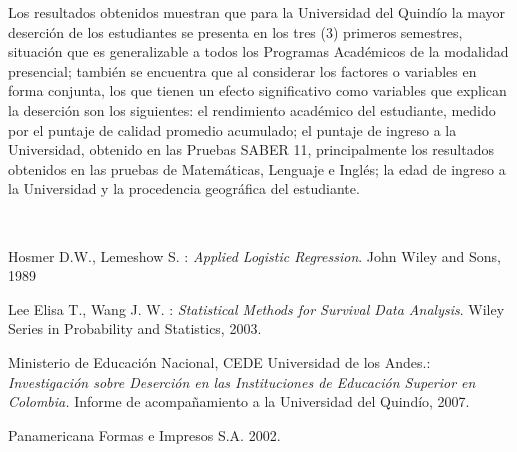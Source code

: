\begin{titlepage}
\begin{minipage}{0.85\linewidth}
\begin{minipage}{0.85\linewidth}
\begin{resumen}
Los resultados obtenidos muestran que para la Universidad del Quind\'io la
mayor deserci\'on de los estudiantes se presenta en los tres (3) primeros
semestres, situaci\'on que es generalizable a todos los Programas Acad\'emicos
de la modalidad presencial; tambi\'en se encuentra que al considerar los
factores o variables en forma conjunta, los que tienen un efecto
significativo como variables que explican la deserci\'on son  los siguientes:
el rendimiento acad\'emico del estudiante, medido por el puntaje de calidad
promedio acumulado; el puntaje de ingreso a la Universidad, obtenido en las
Pruebas SABER 11, principalmente los resultados obtenidos en las pruebas de
Matem\'aticas, Lenguaje e Ingl\'es; la edad de ingreso a la Universidad y la
procedencia geogr\'afica del estudiante.
    \end{resumen}
\end{minipage}
\vspace*{5pt}\\
\footnotesize
%  
    
\end{minipage}
\vspace{5pt}
\begin{thebibliography}{99}

Hosmer D.W., Lemeshow S. : \emph{Applied Logistic Regression}. John Wiley
and Sons, 1989 

Lee Elisa T., Wang J. W. : \emph{Statistical Methods for Survival Data
Analysis}. Wiley Series in Probability and Statistics, 2003. 

Ministerio de Educaci\'on Nacional, CEDE Universidad de los Andes.: \emph{%
Investigaci\'on sobre Deserci\'on en las Instituciones de Educaci\'on Superior en
Colombia.} Informe de acompa\~namiento a la Universidad del Quind\'io, 2007. 

Panamericana Formas e Impresos S.A. 2002.
\end{thebibliography}
\end{titlepage}
